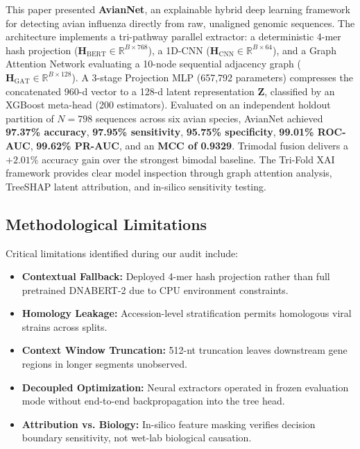 \documentclass[conference]{IEEEtran}
\begin{document}
This paper presented \textbf{AvianNet}, an explainable hybrid deep learning framework for detecting avian influenza directly from raw, unaligned genomic sequences. The architecture implements a tri-pathway parallel extractor: a deterministic 4-mer hash projection ($\mathbf{H}_{\text{BERT}} \in \mathbb{R}^{B \times 768}$), a 1D-CNN ($\mathbf{H}_{\text{CNN}} \in \mathbb{R}^{B \times 64}$), and a Graph Attention Network evaluating a 10-node sequential adjacency graph ($\mathbf{H}_{\text{GAT}} \in \mathbb{R}^{B \times 128}$). A 3-stage Projection MLP (657,792 parameters) compresses the concatenated 960-d vector to a 128-d latent representation $\mathbf{Z}$, classified by an XGBoost meta-head (200 estimators). Evaluated on an independent holdout partition of $N = 798$ sequences across six avian species, AvianNet achieved \textbf{97.37\% accuracy}, \textbf{97.95\% sensitivity}, \textbf{95.75\% specificity}, \textbf{99.01\% ROC-AUC}, \textbf{99.62\% PR-AUC}, and an \textbf{MCC of 0.9329}. Trimodal fusion delivers a $+2.01\%$ accuracy gain over the strongest bimodal baseline. The Tri-Fold XAI framework provides clear model inspection through graph attention analysis, TreeSHAP latent attribution, and in-silico sensitivity testing.

\subsection{Methodological Limitations}

Critical limitations identified during our audit include:
\begin{itemize}
    \item \textbf{Contextual Fallback:} Deployed 4-mer hash projection rather than full pretrained DNABERT-2 due to CPU environment constraints.
    \item \textbf{Homology Leakage:} Accession-level stratification permits homologous viral strains across splits.
    \item \textbf{Context Window Truncation:} 512-nt truncation leaves downstream gene regions in longer segments unobserved.
    \item \textbf{Decoupled Optimization:} Neural extractors operated in frozen evaluation mode without end-to-end backpropagation into the tree head.
    \item \textbf{Attribution vs. Biology:} In-silico feature masking verifies decision boundary sensitivity, not wet-lab biological causation.
\end{itemize}
\end{document}
